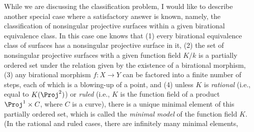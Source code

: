 {\medskip
While we are discussing the classification problem, I would like to describe another special case where a satisfactory answer is known, namely, the classification of nonsingular projective surfaces within a given birational equivalence class. In this case one knows that (1) every birational equivalence class of surfaces has a nonsingular projective surface in it, (2) the set of nonsingular projective surfaces with a given function field $K/k$ is a partially ordered set under the relation given by the existence of a birational morphism, (3) any birational morphism $f\colon X\to Y$ can be factored into a finite number of steps, each of which is a blowing-up of a point, and (4) unless $K$ is \emph{rational} (i.e., equal to $K(\Proj^2)$) or \emph{ruled} (i.e., $K$ is the function field of a product $\Proj^1\times C$, where $C$ is a curve), there is a unique minimal element of this partially ordered set, which is called the \emph{minimal model} of the function field $K$. (In the rational and ruled cases, there are infinitely many minimal elements,}
